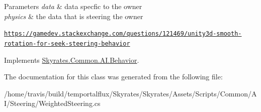 \begin{DoxyParams}{Parameters}
{\em data} & data specfic to the owner\\
\hline
{\em physics} & the data that is steering the owner\\
\hline
\end{DoxyParams}
 \href{https://gamedev.stackexchange.com/questions/121469/unity3d-smooth-rotation-for-seek-steering-behavior}{\tt https\-://gamedev.\-stackexchange.\-com/questions/121469/unity3d-\/smooth-\/rotation-\/for-\/seek-\/steering-\/behavior} 

Implements \hyperlink{class_skyrates_1_1_common_1_1_a_i_1_1_behavior_ae905e75f0456dececef5a5bccea7bcf7}{Skyrates.\-Common.\-A\-I.\-Behavior}.



The documentation for this class was generated from the following file\-:\begin{DoxyCompactItemize}
\item 
/home/travis/build/temportalflux/\-Skyrates/\-Skyrates/\-Assets/\-Scripts/\-Common/\-A\-I/\-Steering/Weighted\-Steering.\-cs\end{DoxyCompactItemize}
